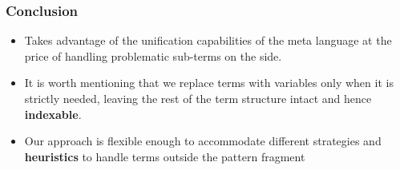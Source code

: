 \documentclass{pres}
\begin{document}
\begin{frame}
  \frametitle{Conclusion}

  \begin{itemize}
    \item Takes advantage of the unification capabilities of the meta language
          at the price of handling problematic sub-terms on the side.
    \item It is worth mentioning that we replace terms with variables only when
          it is strictly needed, leaving the rest of the term structure intact
          and hence \textbf{indexable}.
    \item Our approach is flexible enough to accommodate different strategies
          and \textbf{heuristics} to handle terms outside the pattern fragment
  \end{itemize}

\end{frame}
\end{document}
